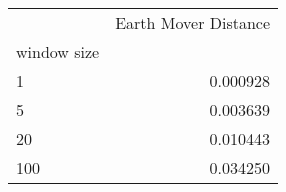 \begin{tabular}{lr}
\toprule
{} &  Earth Mover Distance \\
window size &                       \\
\midrule
1           &              0.000928 \\
5           &              0.003639 \\
20          &              0.010443 \\
100         &              0.034250 \\
\bottomrule
\end{tabular}
